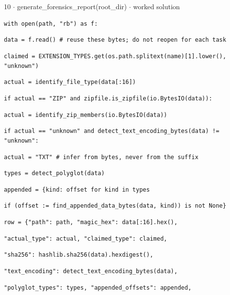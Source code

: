 \documentclass[11pt]{article}
\begin{document}
\begin{keepsection}
\begin{workedbox}{10 \ensuremath{\cdot} generate\_forensics\_report(root\_dir) \ensuremath{\cdot} worked solution}
\begin{enumerate}
\begin{tcolorbox}[colback=Paperblue,colframe=Paperblue,boxrule=0pt,arc=0pt,left=7pt,right=7pt,top=5pt,bottom=5pt]
\noindent\hspace*{3em}\texttt{with open(path, "rb") as f:}\par
\noindent\hspace*{5em}\texttt{data = f.read() \# reuse these bytes; do not reopen for each task}\par
\noindent\hspace*{3em}\texttt{claimed = EXTENSION\_TYPES.get(os.path.splitext(name)[1].lower(), "unknown")}\par
\noindent\hspace*{3em}\texttt{actual = identify\_file\_type(data[:16])}\par
\noindent\hspace*{3em}\texttt{if actual == "ZIP" and zipfile.is\_zipfile(io.BytesIO(data)):}\par
\noindent\hspace*{5em}\texttt{actual = identify\_zip\_members(io.BytesIO(data))}\par
\noindent\hspace*{3em}\texttt{if actual == "unknown" and detect\_text\_encoding\_bytes(data) != "unknown":}\par
\noindent\hspace*{5em}\texttt{actual = "TXT" \# infer from bytes, never from the suffix}\par
\noindent\hspace*{3em}\texttt{types = detect\_polyglot(data)}\par
\noindent\hspace*{3em}\texttt{appended = \{kind: offset for kind in types}\par
\noindent\hspace*{9em}\texttt{if (offset := find\_appended\_data\_bytes(data, kind)) is not None\}}\par
\noindent\hspace*{3em}\texttt{row = \{"path": path, "magic\_hex": data[:16].hex(),}\par
\noindent\hspace*{6em}\texttt{"actual\_type": actual, "claimed\_type": claimed,}\par
\noindent\hspace*{6em}\texttt{"sha256": hashlib.sha256(data).hexdigest(),}\par
\noindent\hspace*{6em}\texttt{"text\_encoding": detect\_text\_encoding\_bytes(data),}\par
\noindent\hspace*{6em}\texttt{"polyglot\_types": types, "appended\_offsets": appended,}\par

\end{tcolorbox}
\end{enumerate}
\end{workedbox}
\end{keepsection}
\end{document}
